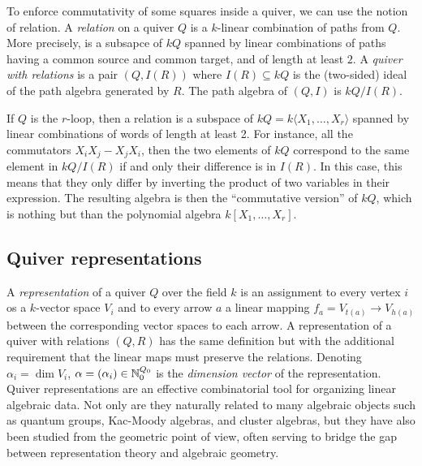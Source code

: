         To enforce commutativity of some squares inside a quiver, we can use the notion of relation. A \emph{relation} on a quiver $Q$ is a $k$-linear combination of paths from $Q$. More precisely, is a subsapce of $kQ$ spanned by linear combinations of paths having a common source and common target, and of length at least $2$. A \emph{quiver with relations} is a pair $(Q,I(R))$ where $I(R)\subseteq kQ$ is the (two-sided) ideal of the path algebra generated by $R$. The path algebra of $(Q,I)$ is $kQ/I(R)$. 
        
        \begin{examp*}
            If $Q$ is the $r$-loop, then a relation is a subspace of $kQ = k\langle X_1,\dots,X_r\rangle$ spanned by linear combinations of words of length at least 2. For instance, all the commutators $X_iX_j-X_jX_i$, then the two elements of $kQ$ correspond to the same element in $kQ/I(R)$ if and only their difference is in $I(R)$. In this case, this means that they only differ by inverting the product of two variables in their expression. The resulting algebra is then the ``commutative version'' of $kQ$, which is nothing but than the polynomial algebra $k[X_1,\dots,X_r]$.
        \end{examp*}

    \subsection{Quiver representations}

        A \emph{representation} of a quiver $Q$ over the field $k$ is an assignment to every vertex $i$ os a $k$-vector space $V_i$ and to every arrow $a$ a linear mapping $f_a=V_{t(a)}\to V_{h(a)}$ between the corresponding vector spaces to each arrow. A representation of a quiver with relations $(Q,R)$ has the same definition but with the additional requirement that the linear maps must preserve the relations.  Denoting $\alpha_i=\dim V_i$, $\alpha=(\alpha_i)\in\mathbb{N}^{Q_0}_0$ is the \emph{dimension vector} of the representation. Quiver representations are an effective combinatorial tool for organizing linear algebraic data. Not only are they naturally related to many algebraic objects such as quantum groups, Kac-Moody algebras, and cluster algebras, but they have also been studied from the geometric point of view, often serving to bridge the gap between representation theory and algebraic geometry. 
        
